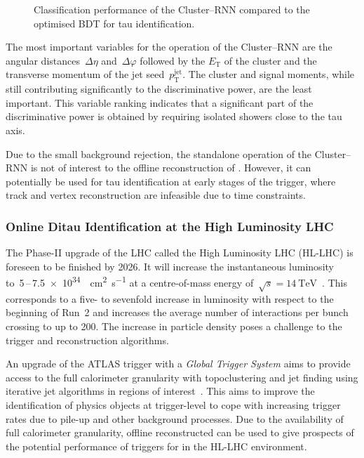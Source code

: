 \begin{figure}[htb]
\begin{subfigure}[t]{0.48\textwidth}
  \end{subfigure}
  \caption[Comparison of the classification performance of Cluster--RNN and
  optimised BDT]{Classification performance of the Cluster--RNN compared to the
    optimised BDT for tau identification.}
  \label{fig:cluster_rnn_roc_ratios}
\end{figure}

The most important variables for the operation of the Cluster--RNN are the
angular distances~$\Delta \eta$ and~$\Delta \varphi$ followed by the
$E_\text{T}$ of the cluster and the transverse momentum of the jet
seed~$p_\text{T}^\text{jet}$. The cluster and signal moments, while still
contributing significantly to the discriminative power, are the least important.
This variable ranking indicates that a significant part of the discriminative
power is obtained by requiring isolated showers close to the tau axis.

Due to the small background rejection, the standalone operation of the
Cluster--RNN is not of interest to the offline reconstruction of \tauhadvis.
However, it can potentially be used for tau identification at early stages of
the trigger, where track and vertex reconstruction are infeasible due to time
constraints.

\subsubsection{Online Ditau Identification at the High Luminosity LHC}
\label{sec:hlt_rate_reduction}

The Phase-II upgrade of the LHC called the High Luminosity LHC (HL-LHC) is
foreseen to be finished by 2026. It will increase the instantaneous luminosity
to~\num{5}\,--\,\SI{7.5e34}{\per\square\centi\metre\per\second} at a
centre-of-mass energy
of~$\sqrt{s} = \SI{14}{\TeV}$~\cite{hl_lhc_prelim_design_report}. This
corresponds to a five- to sevenfold increase in luminosity with respect to the
beginning of Run~2 and increases the average number of interactions per bunch
crossing to up to \num{200}. The increase in particle density poses a challenge
to the trigger and reconstruction algorithms.

An upgrade of the ATLAS trigger with a \emph{Global Trigger System} aims to
provide access to the full calorimeter granularity with topoclustering and jet
finding using iterative jet algorithms in regions of
interest~\cite{phase_2_scoping}. This aims to improve the identification of
physics objects at trigger-level to cope with increasing trigger rates due to
pile-up and other background processes. Due to the availability of full
calorimeter granularity, offline reconstructed \tauhadvis can be used to give
prospects of the potential performance of triggers for \tauhadvis in the HL-LHC
environment.

